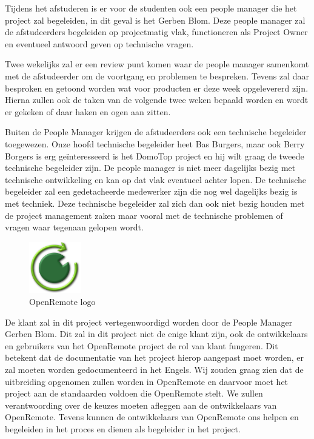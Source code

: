 \documentclass[]{article}
\begin{document}
Tijdens het afstuderen is er voor de studenten ook een people manager
die het project zal begeleiden, in dit geval is het Gerben Blom. Deze
people manager zal de afstudeerders begeleiden op projectmatig vlak,
functioneren als Project Owner en eventueel antwoord geven op technische
vragen.

Twee wekelijks zal er een review punt komen waar de people manager
samenkomt met de afstudeerder om de voortgang en problemen te bespreken.
Tevens zal daar besproken en getoond worden wat voor producten er deze week
opgelevererd zijn. Hierna zullen ook de taken van de volgende twee weken
bepaald worden en wordt er gekeken of daar haken en ogen aan zitten.

Buiten de People Manager krijgen de afstudeerders ook een technische
begeleider toegewezen. Onze hoofd technische begeleider heet Bas Burgers,
maar ook Berry Borgers is erg ge\"interesseerd is het DomoTop project en hij
wilt graag de tweede technische begeleider zijn. De people manager is
niet meer dagelijks bezig met technische ontwikkeling en kan op dat vlak
eventueel achter lopen. De technische begeleider zal een
gedetacheerde medewerker zijn die nog wel dagelijks bezig is met techniek.
Deze technische begeleider zal zich dan ook niet bezig houden met de
project management zaken maar vooral met de technische problemen of vragen
waar tegenaan gelopen wordt.

\begin{figure}
  \begin{center}
    \includegraphics[width=0.20\textwidth]{openremote.pdf}
  \end{center}
  \caption{OpenRemote logo}
\end{figure}

De klant zal in dit project vertegenwoordigd worden door de People Manager
Gerben Blom. Dit zal in dit project niet de enige klant zijn, ook de
ontwikkelaars en gebruikers van het OpenRemote project de rol van klant
fungeren. Dit betekent dat de documentatie van het project hierop aangepast
moet worden, er zal moeten worden gedocumenteerd in het Engels.  
Wij zouden graag zien dat de uitbreiding opgenomen zullen worden in OpenRemote
en daarvoor moet het project aan de standaarden voldoen die OpenRemote stelt. We zullen
verantwoording over de keuzes moeten afleggen aan de ontwikkelaars van
OpenRemote. Tevens kunnen de ontwikkelaars van OpenRemote ons helpen en begeleiden
in het proces en dienen als begeleider in het project.
\end{document}
